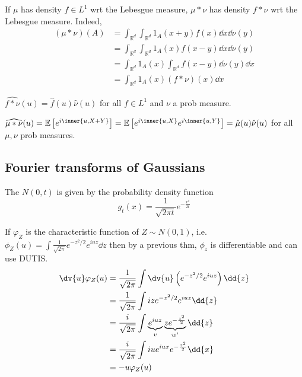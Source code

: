 If $\mu$ has density $f \in L^1$ wrt the Lebesgue measure, $\mu \ast \nu$ has density $f \ast \nu$ wrt the Lebesgue measure.
Indeed,
\begin{align*}
	(\mu \ast \nu)(A) &= \int_{\mathbb R^d} \int_{\mathbb R^d} 1_A(x+y) f(x) \dd{x} \dd{\nu(y)} \\
	&= \int_{\mathbb R^d} \int_{\mathbb R^d} 1_A(x) f(x-y) \dd{x} \dd{\nu(y)} \\
	&= \int_{\mathbb R^d} 1_A(x) \int_{\mathbb R^d}f(x-y) \dd{\nu(y)} \dd{x} \\
	&= \int_{\mathbb R^d} 1_A(x) (f \ast \nu)(x) \dd{x}
\end{align*}

\begin{proposition}
	$\widehat{f \ast \nu}(u) = \hat f(u) \hat \nu(u)$ for all $f \in L^1$ and $\nu$ a prob measure.
\end{proposition}

\begin{proposition}
	$\widehat{\mu \ast \nu}(u) = \expect{e^{i\inner{u,X+Y}}} = \expect{e^{i\inner{u,X}}e^{i\inner{u,Y}}} = \hat \mu(u) \hat \nu(u)$ for all $\mu, \nu$ prob measures.
\end{proposition}

\subsection{Fourier transforms of Gaussians}

\begin{definition}
	The  $N(0,t)$ is given by the probability density function
	\[ g_t(x) = \frac{1}{\sqrt{2\pi t}} e^{-\frac{x^2}{2t}} \]
\end{definition}

If $\varphi_Z$ is the characteristic function of $Z \sim N(0, 1)$, i.e. $\phi_Z(u) = \int \frac{1}{\sqrt{2 \pi}} e^{-z^2 / 2} e^{iuz} \dd{z}$ then by a previous thm, $\phi_z$ is differentiable and can use DUTIS.
\begin{align*}
	\dv{u} \varphi_Z(u) &= \frac{1}{\sqrt{2 \pi}} \int \dv{u} \left(e^{-z^2 / 2} e^{iuz}\right) \dd{z} \\
	&= \frac{1}{\sqrt{2 \pi}} \int iz e^{-z^2 / 2} e^{iuz} \dd{z} \\
	&= \frac{i}{\sqrt{2\pi}} \int \underbrace{e^{iuz}}_{v} \underbrace{z e^{-\frac{z^2}{2}}}_{w'} \dd{z} \\
	&= \frac{i}{\sqrt{2\pi}} \int iu e^{iux} e^{-\frac{z^2}{2}} \dd{x} \\
	&= -u \varphi_Z(u)
\end{align*}

